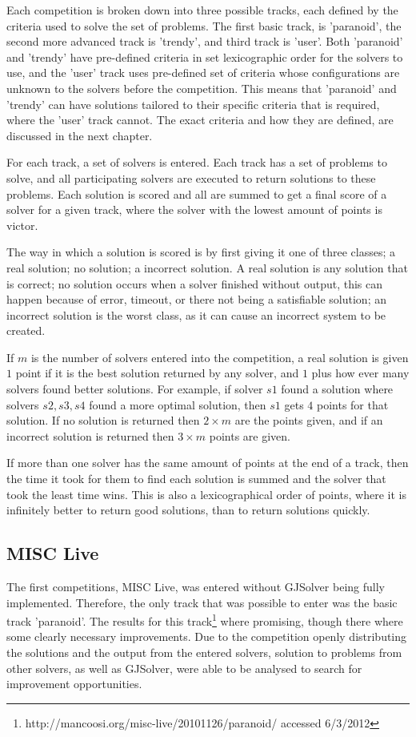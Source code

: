 Each competition is broken down into three possible tracks, each defined by the criteria used to solve the set of problems.
The first basic track, is 'paranoid', the second more advanced track is 'trendy', and third track is 'user'.
Both 'paranoid' and 'trendy' have pre-defined criteria in set lexicographic order for the solvers to use, 
and the 'user' track uses pre-defined set of criteria whose configurations are unknown to the solvers before the competition.
This means that 'paranoid' and 'trendy' can have solutions tailored to their specific criteria that is required, where the 'user' track cannot.
The exact criteria and how they are defined, are discussed in the next chapter.

For each track, a set of solvers is entered.
Each track has a set of problems to solve, and all participating solvers are executed to return solutions to these problems.
Each solution is scored and all are summed to get a final score of a solver for a given track, where the solver with the lowest amount of points is victor.

The way in which a solution is scored is by first giving it one of three classes; a real solution; no solution; a incorrect solution.
A real solution is any solution that is correct; no solution occurs when a solver finished without output, this can happen because of error, timeout, or there not being a satisfiable solution;
an incorrect solution is the worst class, as it can cause an incorrect system to be created.

If $m$ is the number of solvers entered into the competition,
a real solution is given $1$ point if it is the best solution returned by any solver, and $1$ plus how ever many solvers found better solutions.
For example, if solver $s1$ found a solution where solvers $s2,s3,s4$ found a more optimal solution, then $s1$ gets $4$ points for that solution.
If no solution is returned then $2\times m$ are the points given, and if an incorrect solution is returned then $3 \times m$ points are given.

If more than one solver has the same amount of points at the end of a track, then the time it took for them to find each solution is summed and the solver that took the least time wins.
This is also a lexicographical order of points, where it is infinitely better to return good solutions, than to return solutions quickly.

\subsection{MISC Live}
The first competitions, MISC Live, was entered without GJSolver being fully implemented.
Therefore, the only track that was possible to enter was the basic track 'paranoid'.
The results for this track\footnote{http://mancoosi.org/misc-live/20101126/paranoid/ accessed 6/3/2012} where promising, though there where some clearly necessary improvements.
Due to the competition openly distributing the solutions and the output from the entered solvers, solution to problems from other solvers, 
as well as GJSolver, were able to be analysed to search for improvement opportunities.

